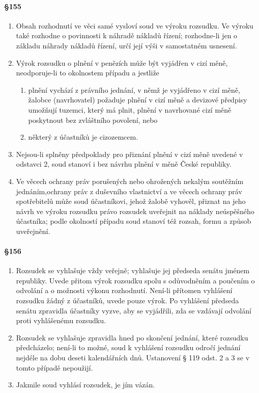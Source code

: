 \paragraph{\S 155}

\begin{enumerate}[label={(\arabic*)}]
  \item Obsah rozhodnutí ve věci samé vysloví soud ve výroku rozsudku. Ve výroku také rozhodne o povinnosti k náhradě nákladů řízení; rozhodne-li jen o základu náhrady nákladů řízení, určí její výši v samostatném usnesení.
  \item Výrok rozsudku o plnění v penězích může být vyjádřen v cizí měně, neodporuje-li to okolnostem případu a jestliže
  \begin{enumerate}[label={\alph*)}]
    \item plnění vychází z právního jednání, v němž je vyjádřeno v cizí měně, žalobce (navrhovatel) požaduje plnění v cizí měně a devizové předpisy umožňují tuzemci, který má plnit, plnění v navrhované cizí měně poskytnout bez zvláštního povolení, nebo
    \item některý z účastníků je cizozemcem.
  \end{enumerate}
  \item Nejsou-li splněny předpoklady pro přiznání plnění v cizí měně uvedené v odstavci 2, soud stanoví i bez návrhu plnění v měně České republiky.
  \item Ve věcech ochrany práv porušených nebo ohrožených nekalým soutěžním jednáním,ochrany práv z duševního vlastnictví a ve věcech ochrany práv spotřebitelů může soud účastníkovi, jehož žalobě vyhověl, přiznat na jeho návrh ve výroku rozsudku právo rozsudek uveřejnit na náklady neúspěšného účastníka; podle okolností případu soud stanoví též rozsah, formu a způsob uveřejnění.
\end{enumerate}

\paragraph{\S 156}

\begin{enumerate}[label={(\arabic*)}]
  \item Rozsudek se vyhlašuje vždy veřejně; vyhlašuje jej předseda senátu jménem republiky. Uvede přitom výrok rozsudku spolu s odůvodněním a poučením o odvolání a o možnosti výkonu rozhodnutí. Není-li přítomen vyhlášení rozsudku žádný z účastníků, uvede pouze výrok. Po vyhlášení předseda senátu zpravidla účastníky vyzve, aby se vyjádřili, zda se vzdávají odvolání proti vyhlášenému rozsudku.
  \item Rozsudek se vyhlašuje zpravidla hned po skončení jednání, které rozsudku předcházelo; není-li to možné, soud k vyhlášení rozsudku odročí jednání nejdéle na dobu deseti kalendářních dnů. Ustanovení § 119 odst. 2 a 3 se v tomto případě nepoužijí.
  \item Jakmile soud vyhlásí rozsudek, je jím vázán.
\end{enumerate}

